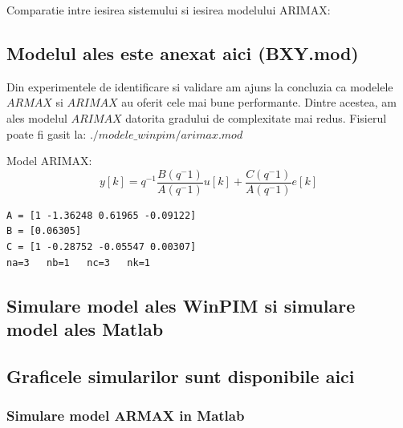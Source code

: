 \documentclass[12pt,english]{article}
\begin{document}
Comparatie intre iesirea sistemului si iesirea modelului ARIMAX:
\begin{center}
\end{center}

\subsection {Modelul ales este anexat aici (BXY.mod) }
Din experimentele de identificare si validare am ajuns la concluzia ca modelele $ARMAX$ si $ARIMAX$ au oferit cele mai bune performante. Dintre acestea, am ales modelul $ARIMAX$ datorita gradului de complexitate mai redus.
Fisierul poate fi gasit la: $./modele\_winpim/arimax.mod$

Model ARIMAX:
\[ y[k] = q^{-1} \dfrac{B(q^-1)}{A(q^-1)}u[k] + \dfrac{C(q^-1)}{A(q^-1)}e[k] \]

\begin{lstlisting}
A = [1 -1.36248 0.61965 -0.09122]
B = [0.06305]
C = [1 -0.28752 -0.05547 0.00307]
na=3   nb=1   nc=3   nk=1
\end{lstlisting}

\subsection {Simulare model ales WinPIM si simulare model ales Matlab }
\subsection {Graficele simularilor sunt disponibile aici }
\subsubsection {Simulare model ARMAX in Matlab }
\begin{center}
\end{center}
\end{document}
